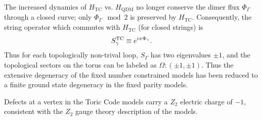 \documentclass[twocolumn,prb,aps,floatfix,superscriptaddress]{revtex4-1}
\newcommand{\HQDM}{H_\mathrm{QDM}}
\newcommand{\HTC}{H_\mathrm{TC}}
\begin{document}
The increased dynamics of $\HTC$ vs. $\HQDM$ no longer conserve the dimer flux $\Phi_\Gamma$ through a closed curve; only $\Phi_\Gamma \mod 2$ is preserved by $\HTC$. Consequently, the string operator which commutes with $\HTC$ (for closed strings) is
\begin{equation}
S_\gamma^{\rm{TC}} \equiv e^{i\pi \Phi_\gamma}.
\end{equation}
Thus for each topologically non-trival loop, $S_\Gamma$ has two eigenvalues $\pm 1$, and the topological sectors on the torus can be labeled as $\Omega: (\pm 1,\pm1)$. Thus the extensive degeneracy of the fixed number constrained models has been reduced to a finite ground state degeneracy in the fixed parity models.

Defects at a vertex in the Toric Code models carry a $Z_2$ electric charge of $-1$, consistent with the $Z_2$ gauge theory description of the models.
\end{document}
